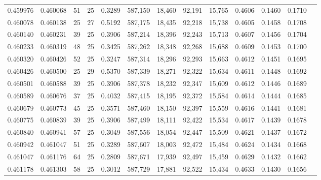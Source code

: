 \begin{tabular}{rrrrrrrrrrrrr}
0.459976 & 0.460068 &    51 &  25 &                                     0.3289 & 587,150 &  18,460 &  92,191 &  15,765 & 0.4606 & 0.1460 & 0.1710 \\
0.460078 & 0.460138 &    25 &  27 &                                     0.5192 & 587,175 &  18,435 &  92,218 &  15,738 & 0.4605 & 0.1458 & 0.1708 \\
0.460140 & 0.460231 &    39 &  25 &                                     0.3906 & 587,214 &  18,396 &  92,243 &  15,713 & 0.4607 & 0.1456 & 0.1704 \\
0.460233 & 0.460319 &    48 &  25 &                                     0.3425 & 587,262 &  18,348 &  92,268 &  15,688 & 0.4609 & 0.1453 & 0.1700 \\
0.460320 & 0.460426 &    52 &  25 &                                     0.3247 & 587,314 &  18,296 &  92,293 &  15,663 & 0.4612 & 0.1451 & 0.1695 \\
0.460426 & 0.460500 &    25 &  29 &                                     0.5370 & 587,339 &  18,271 &  92,322 &  15,634 & 0.4611 & 0.1448 & 0.1692 \\
0.460501 & 0.460588 &    39 &  25 &                                     0.3906 & 587,378 &  18,232 &  92,347 &  15,609 & 0.4612 & 0.1446 & 0.1689 \\
0.460589 & 0.460676 &    37 &  25 &                                     0.4032 & 587,415 &  18,195 &  92,372 &  15,584 & 0.4614 & 0.1444 & 0.1685 \\
0.460679 & 0.460773 &    45 &  25 &                                     0.3571 & 587,460 &  18,150 &  92,397 &  15,559 & 0.4616 & 0.1441 & 0.1681 \\
0.460775 & 0.460839 &    39 &  25 &                                     0.3906 & 587,499 &  18,111 &  92,422 &  15,534 & 0.4617 & 0.1439 & 0.1678 \\
0.460840 & 0.460941 &    57 &  25 &                                     0.3049 & 587,556 &  18,054 &  92,447 &  15,509 & 0.4621 & 0.1437 & 0.1672 \\
0.460942 & 0.461047 &    51 &  25 &                                     0.3289 & 587,607 &  18,003 &  92,472 &  15,484 & 0.4624 & 0.1434 & 0.1668 \\
0.461047 & 0.461176 &    64 &  25 &                                     0.2809 & 587,671 &  17,939 &  92,497 &  15,459 & 0.4629 & 0.1432 & 0.1662 \\
0.461178 & 0.461303 &    58 &  25 &                                     0.3012 & 587,729 &  17,881 &  92,522 &  15,434 & 0.4633 & 0.1430 & 0.1656 \\

\end{tabular}
